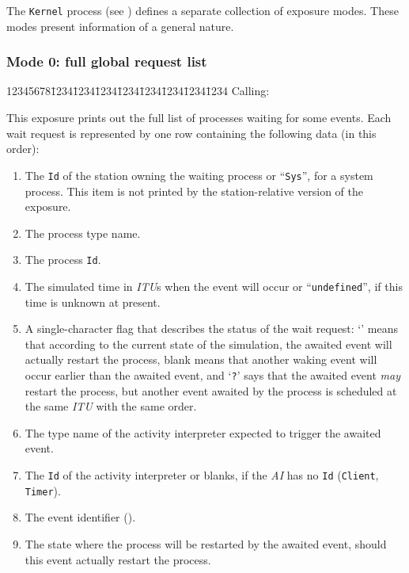 The {\tt Kernel} process (see ) defines a separate collection
of exposure modes.
These modes present information of a general nature.

\subsubsection*{Mode 0: full global request list}

{\tt\begin{tabbing}
12345678\=1234\=1234\=1234\=1234\=1234\=1234\=1234\=1234\kill
{\rm Calling:}
\end{tabbing}}

This exposure prints out the full list of processes waiting for some
events.
Each wait request is represented by one row containing the following data
(in this order):

\begin{enumerate}
\item
The {\tt Id} of the station owning the waiting
process or ``{\tt Sys}'', for a system process.
This item is not printed by the station-relative version of the exposure.
\item
The process type name.
\item
The process {\tt Id}.
\item
The simulated time in {\em ITU\/}s when the event will occur or
``{\tt undefined}'', if this time is unknown at present.
\item
A single-character flag that describes the status of the wait request:
`{\tt *}' means that according to the current state of the simulation,
the awaited event will actually restart the process,
blank means that another
waking event will occur earlier than the awaited event, and `{\tt ?}' says that
the awaited event {\em may\/} restart the process, but another event awaited
by the process is scheduled at the same {\em ITU} with the same order.
\item
The type name of the activity interpreter expected to trigger the awaited
event.
\item
The {\tt Id} of the activity interpreter or blanks, if the {\em AI\/} has no
{\tt Id} ({\tt Client}, {\tt Timer}).
\item
The event identifier ().
\item
The state where the process will be restarted by the awaited event, should this
event actually restart the process.
\end{enumerate}

